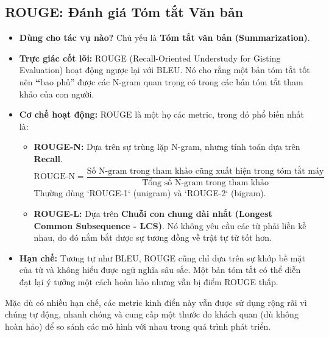 \subsection{ROUGE: Đánh giá Tóm tắt Văn bản}
\label{ssec:rouge}
\begin{itemize}
    \item \textbf{Dùng cho tác vụ nào?} Chủ yếu là \textbf{Tóm tắt văn bản (Summarization)}.
    \item \textbf{Trực giác cốt lõi:} ROUGE (Recall-Oriented Understudy for Gisting Evaluation) hoạt động ngược lại với BLEU. Nó cho rằng một bản tóm tắt tốt nên \textbf “bao phủ” được các N-gram quan trọng có trong các bản tóm tắt tham khảo của con người.
    \item \textbf{Cơ chế hoạt động:} ROUGE là một họ các metric, trong đó phổ biến nhất là:
        \begin{itemize}
            \item \textbf{ROUGE-N:} Dựa trên sự trùng lặp N-gram, nhưng tính toán dựa trên \textbf{Recall}.
                $$ \text{ROUGE-N} = \frac{\text{Số N-gram trong tham khảo cũng xuất hiện trong tóm tắt máy}}{\text{Tổng số N-gram trong tham khảo}} $$
                Thường dùng `ROUGE-1` (unigram) và `ROUGE-2` (bigram).
            \item \textbf{ROUGE-L:} Dựa trên \textbf{Chuỗi con chung dài nhất (Longest Common Subsequence - LCS)}. Nó không yêu cầu các từ phải liền kề nhau, do đó nắm bắt được sự tương đồng về trật tự từ tốt hơn.
        \end{itemize}
    \item \textbf{Hạn chế:} Tương tự như BLEU, ROUGE cũng chỉ dựa trên sự khớp bề mặt của từ và không hiểu được ngữ nghĩa sâu sắc. Một bản tóm tắt có thể diễn đạt lại ý tưởng một cách hoàn hảo nhưng vẫn bị điểm ROUGE thấp.
\end{itemize}

Mặc dù có nhiều hạn chế, các metric kinh điển này vẫn được sử dụng rộng rãi vì chúng tự động, nhanh chóng và cung cấp một thước đo khách quan (dù không hoàn hảo) để so sánh các mô hình với nhau trong quá trình phát triển.